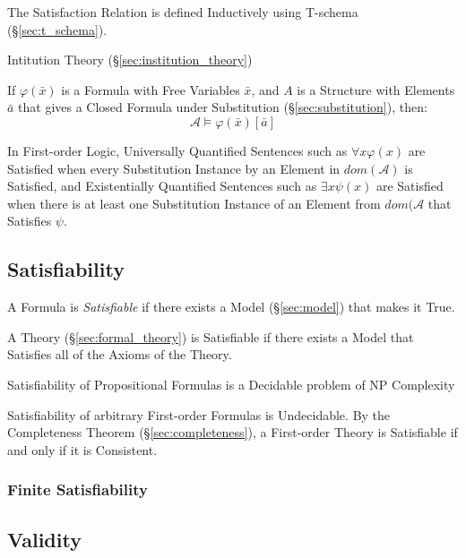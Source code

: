 The Satisfaction Relation is defined Inductively using T-schema
(\S\ref{sec:t_schema}).

Intitution Theory (\S\ref{sec:institution_theory})

If $\varphi(\bar{x})$ is a Formula with Free Variables $\bar{x}$, and
$A$ is a Structure with Elements $\bar{a}$ that gives a Closed Formula
under Substitution (\S\ref{sec:substitution}), then:
\[
  \mathcal{A} \models \varphi(\bar{x})[\bar{a}]
\]

In First-order Logic, Universally Quantified Sentences such as
$\forall x \varphi (x)$ are Satisfied when every Substitution Instance
by an Element in $dom(\mathcal{A})$ is Satisfied, and Existentially
Quantified Sentences such as $\exists x \psi (x)$ are Satisfied when
there is at least one Substitution Instance of an Element from
$dom(\mathcal{A}$ that Satisfies $\psi$.



\subsection{Satisfiability}\label{sec:satisfiability}

A Formula is \emph{Satisfiable} if there exists a Model
(\S\ref{sec:model}) that makes it True.

A Theory (\S\ref{sec:formal_theory}) is Satisfiable if there exists a
Model that Satisfies all of the Axioms of the Theory.

Satisfiability of Propositional Formulas is a Decidable problem of NP
Complexity %

Satisfiability of arbitrary First-order Formulas is Undecidable. By
the Completeness Theorem (\S\ref{sec:completeness}), a First-order
Theory is Satisfiable if and only if it is Consistent.



\subsubsection{Finite Satisfiability}\label{sec:finite_satisfiability}



\subsection{Validity}\label{sec:validity}

